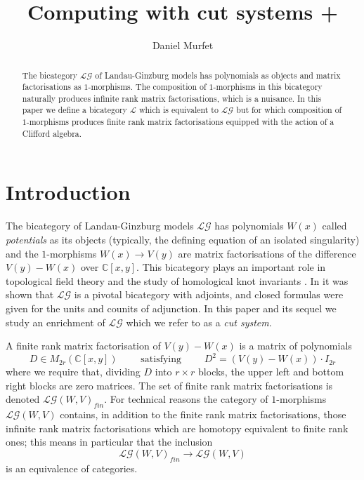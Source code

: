 \documentclass[english,letter paper,12pt,leqno]{article}
\theoremstyle{example}
\numberwithin{equation}{section}
\def\res{\operatorname{Res}}
\def\LG{\mathcal{LG}}
\def\nC{\mathds{C}}
\begin{document}
\def\Res{\res\!}
\newcommand{\ud}{\mathrm{d}}
\newcommand{\Ress}[1]{\res_{#1}\!}
\newcommand{\cat}[1]{\mathcal{#1}}
\newcommand{\lto}{\longrightarrow}
\newcommand{\xlto}[1]{\stackrel{#1}\lto}
\newcommand{\mf}[1]{\mathfrak{#1}}
\newcommand{\md}[1]{\mathscr{#1}}
\def\sus{\l}
\def\l{\,|\,}
\def\sgn{\textup{sgn}}

\title{Computing with cut systems +}
\author{Daniel Murfet}

\maketitle

\begin{abstract}
The bicategory $\LG$ of Landau-Ginzburg models has polynomials as objects and matrix factorisations as $1$-morphisms. The composition of $1$-morphisms in this bicategory naturally produces infinite rank matrix factorisations, which is a nuisance. In this paper we define a bicategory $\cat{L}$ which is equivalent to $\LG$ but for which composition of $1$-morphisms produces finite rank matrix factorisations equipped with the action of a Clifford algebra.
\end{abstract}

\tableofcontents

\section{Introduction}

The bicategory of Landau-Ginzburg models $\LG$ has polynomials $W(x)$ called \textsl{potentials} as its objects (typically, the defining equation of an isolated singularity) and the $1$-morphisms $W(x) \lto V(y)$ are matrix factorisations of the difference $V(y) - W(x)$ over $\nC[x,y]$. This bicategory plays an important role in topological field theory \cite{McNameethesis,lgdual,genorb} and the study of homological knot invariants \cite{kr0401268}. In \cite{lgdual} it was shown that $\LG$ is a pivotal bicategory with adjoints, and closed formulas were given for the units and counits of adjunction. In this paper and its sequel we study an enrichment of $\LG$ which we refer to as a \emph{cut system}.

A finite rank matrix factorisation of $V(y) - W(x)$ is a matrix of polynomials
\[
D \in M_{2r}( \nC[x,y] ) \qquad \text{ satisfying } \qquad D^2 = (V(y) - W(x)) \cdot I_{2r}
\]
where we require that, dividing $D$ into $r \times r$ blocks, the upper left and bottom right blocks are zero matrices. The set of finite rank matrix factorisations is denoted $\LG(W,V)_{fin}$. For technical reasons the category of $1$-morphisms $\LG(W,V)$ contains, in addition to the finite rank matrix factorisations, those infinite rank matrix factorisations which are homotopy equivalent to finite rank ones; this means in particular that the inclusion
\[
\LG(W,V)_{fin} \lto \LG(W,V)
\]
is an equivalence of categories.
\end{document}

